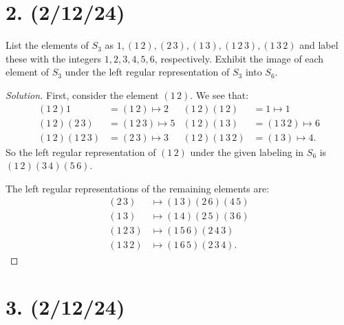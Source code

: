 \documentclass{article}
\begin{document}
\section*{2. (2/12/24)}

List the elements of $S_3$ as $1, (1\, 2), (2\, 3), (1\, 3), (1\, 2\, 3), (1\, 3\, 2)$ and label these with the integers $1, 2, 3, 4, 5, 6$, respectively. Exhibit the image of each element of $S_3$ under the left regular representation of $S_3$ into $S_6$.

\begin{proof}[Solution]
    First, consider the element $(1\, 2)$. We see that:
    \begin{align*}
        (1\,2)1 &= (1\,2) \mapsto 2 &  (1\,2)(1\,2) &= 1 \mapsto 1 \\
        (1\,2)(2\,3) &= (1\,2\,3) \mapsto 5 & (1\,2)(1\,3) &= (1\,3\,2) \mapsto 6 \\
        (1\,2)(1\,2\,3) &= (2\,3) \mapsto 3 & (1\,2)(1\,3\,2) &= (1\,3) \mapsto 4.
    \end{align*}
    So the left regular representation of $(1\,2)$ under the given labeling in $S_6$ is $(1\,2)(3\,4)(5\,6)$.

    The left regular representations of the remaining elements are:
    \begin{align*}
        (2\,3) &\mapsto (1\,3)(2\,6)(4\,5) \\
        (1\,3) &\mapsto (1\,4)(2\,5)(3\,6) \\
        (1\,2\,3) &\mapsto (1\,5\,6)(2\,4\,3) \\
        (1\,3\,2) &\mapsto (1\,6\,5)(2\,3\,4).
    \end{align*}
\end{proof}

\section*{3. (2/12/24)}
\end{document}
